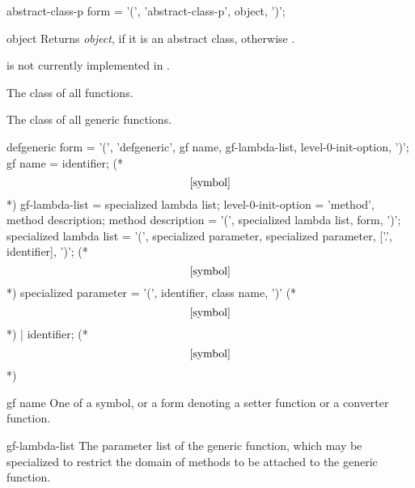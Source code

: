 %
%
\savesyntax\abstractClassPSyntax\vbox{\syntax
abstract-class-p form
   = '(', 'abstract-class-p', object, ')';
\endsyntax}
%
\begin{arguments}
    \item[object] Returns {\em object\/}, if it is an abstract class, otherwise
    \nil{}.
\end{arguments}
%
\begin{note}
     is not currently implemented in \youtoo.
\end{note}
%
\begin{optDefinition}
%
%
The class of all functions.

%
The class of all generic functions.

\label{defgeneric-0}
%
\Syntax
\savesyntax{}\vbox{\syntax
defgeneric form
   = '(', 'defgeneric', gf name, gf-lambda-list,
     {level-0-init-option}, ')';
gf name
   = identifier;     (* \[\ref{symbol}\] *)
gf-lambda-list
   = specialized lambda list;
level-0-init-option
   = 'method', method description;
method description
   = '(', specialized lambda list, {form}, ')';
specialized lambda list
   = '(', specialized parameter,
     {specialized parameter},
     ['.', identifier], ')';     (* \[\ref{symbol}\] *)
specialized parameter
   = '(', identifier, class name, ')'     (* \[\ref{symbol}\] *)
   | identifier;     (* \[\ref{symbol}\] *)
\endsyntax}
\label{defgeneric-syntax-table}
%
\begin{arguments}
    \item[gf name] One of a symbol, or a form denoting a setter function or a
    converter function.

    \item[gf-lambda-list] The parameter list of the generic function, which may
    be specialized to restrict the domain of methods to be attached to the
    generic function.


\end{arguments}
\end{optDefinition}

